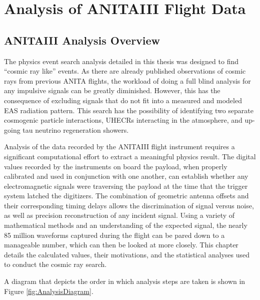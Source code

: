 \chapter{Analysis of ANITAIII Flight Data}
\section{ANITAIII Analysis Overview}
	The physics event search analysis detailed in this thesis was designed to find ``cosmic ray like'' events.  As there are already published observations of cosmic rays from previous ANITA flights, the workload of doing a full blind analysis for any impulsive signals can be greatly diminished.  However, this has the consequence of excluding signals that do not fit into a measured and modeled EAS radiation pattern.  This search has the possibility of identifying two separate cosmogenic particle interactions, UHECRs interacting in the atmosphere, and up-going tau neutrino regeneration showers.
	
	Analysis of the data recorded by the ANITAIII flight instrument requires a significant computational effort to extract a meaningful physics result.  The digital values recorded by the instruments on board the payload, when properly calibrated and used in conjunction with one another, can establish whether any electromagnetic signals were traversing the payload at the time that the trigger system latched the digitizers.  The combination of geometric antenna offsets and their corresponding timing delays allows the discrimination of signal versus noise, as well as precision reconstruction of any incident signal.  Using a variety of mathematical methods and an understanding of the expected signal, the nearly 85 million waveforms captured during the flight can be pared down to a manageable number, which can then be looked at more closely.  This chapter details the calculated values, their motivations, and the statistical analyses used to conduct the cosmic ray search.
	
	A diagram that depicts the order in which analysis steps are taken is shown in Figure \ref{fig:AnalysisDiagram}. 
	
